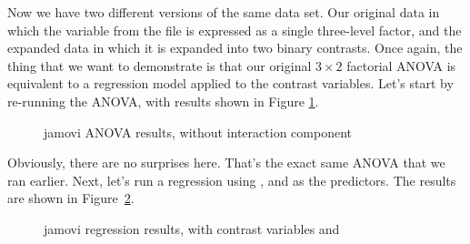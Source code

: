 
Now we have two different versions of the same data set. Our original data in which the  variable from the  file is expressed as a single three-level factor, and the expanded data  in which it is expanded into two binary contrasts. Once again, the thing that we want to demonstrate is that our original $3 \times 2$ factorial ANOVA is equivalent to a regression model applied to the contrast variables. Let's start by re-running the ANOVA, with results shown in Figure \ref{fig:factorialanova9}.

\begin{figure}[!htb]
\begin{center}
\caption{jamovi ANOVA results, without interaction component}
\label{fig:factorialanova9}
\HR
\end{center}
\end{figure}

Obviously, there are no surprises here. That's the exact same ANOVA that we ran earlier. Next, let's run a regression using ,  and  as the predictors. The results are shown in Figure~\ref{fig:factorialanova10}.

\begin{figure}[!htb]
\begin{center}
\caption{jamovi regression results, with contrast variables  and }
\label{fig:factorialanova10}
\HR
\end{center}
\end{figure}

